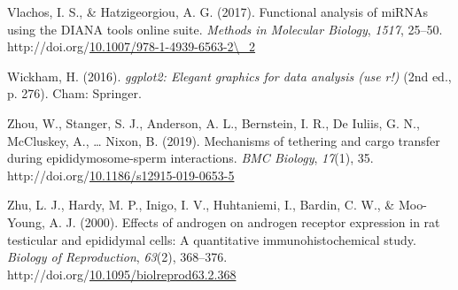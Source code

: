 \documentclass[12pt,twoside]{reedthesis}
\newlength{\cslhangindent}
\newenvironment{CSLReferences}[2] %
 {%
  \setlength{\parindent}{0pt}
  \ifodd #1 \everypar{\setlength{\hangindent}{\cslhangindent}}\ignorespaces\fi
  \ifnum #2 > 0
  \setlength{\parskip}{#2\baselineskip}
  \fi
 }%
 {}
\begin{document}
\begin{CSLReferences}{1}{0}
\leavevmode{}%
Vlachos, I. S., \& Hatzigeorgiou, A. G. (2017). Functional analysis of {miRNAs} using the {DIANA} tools online suite. \emph{Methods in Molecular Biology}, \emph{1517}, 25--50. http://doi.org/\href{https://doi.org/10.1007/978-1-4939-6563-2/_2}{10.1007/978-1-4939-6563-2\textbackslash\_2}

\leavevmode{}%
Wickham, H. (2016). \emph{ggplot2: Elegant graphics for data analysis (use r!)} (2nd ed., p. 276). Cham: Springer.

\leavevmode{}%
Zhou, W., Stanger, S. J., Anderson, A. L., Bernstein, I. R., De Iuliis, G. N., McCluskey, A., \ldots{} Nixon, B. (2019). Mechanisms of tethering and cargo transfer during epididymosome-sperm interactions. \emph{{BMC} Biology}, \emph{17}(1), 35. http://doi.org/\href{https://doi.org/10.1186/s12915-019-0653-5}{10.1186/s12915-019-0653-5}

\leavevmode{}%
Zhu, L. J., Hardy, M. P., Inigo, I. V., Huhtaniemi, I., Bardin, C. W., \& Moo-Young, A. J. (2000). Effects of androgen on androgen receptor expression in rat testicular and epididymal cells: A quantitative immunohistochemical study. \emph{Biology of Reproduction}, \emph{63}(2), 368--376. http://doi.org/\href{https://doi.org/10.1095/biolreprod63.2.368}{10.1095/biolreprod63.2.368}

\end{CSLReferences}

\end{document}

